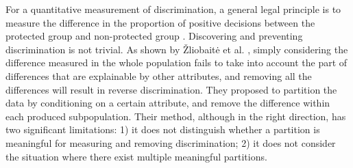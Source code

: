 \documentclass[twoside,leqno,twocolumn]{article}
\begin{document}
For a quantitative measurement of discrimination, a general legal principle is to measure the difference in the proportion of positive decisions between the protected group and non-protected group \cite{romei2014multidisciplinary}. Discovering and preventing discrimination is not trivial. As shown by \v{Z}liobait\.{e} et al. \cite{zliobaite2011handling}, simply considering the difference measured in the whole population fails to take into account the part of differences that are explainable by other attributes, and removing all the differences will result in reverse discrimination. They proposed to partition the data by conditioning on a certain attribute, and remove the difference within each produced subpopulation. Their method, although in the right direction, has two significant limitations: 1) it does not distinguish whether a partition is meaningful for measuring and removing discrimination; 2) it does not consider the situation where there exist multiple meaningful partitions. %



\setlength{\tabcolsep}{3.5pt}
\end{document}
